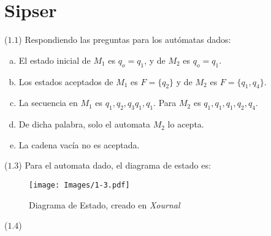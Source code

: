 

\section*{Sipser}



\begin{mdframed}[style = warning]
	\begin{problem}
		($1.1$) Respondiendo las preguntas para los autómatas dados:
			\begin{enumerate}[a)]
				\item El estado inicial de $M_1$ es $q_o = q_1$, y de $M_2$ es $q_o = q_1$.
				\item Los estados aceptados de $M_1$ es $F = \{ q_2 \}$ y de $M_2$ es $F = \{ q_1,q_4 \}$.
				\item La secuencia en $M_1$ es $q_1,q_2,q_3q_1,q_1$. Para $M_2$ es $q_1,q_1,q_1,q_2,q_4$.
				\item De dicha palabra, solo el automata $M_2$ lo acepta.
				\item La cadena vacía no es aceptada.
			\end{enumerate}
	\end{problem}
\end{mdframed}











\begin{mdframed}[style = warning]
	\begin{problem}
		($1.3$) Para el automata dado, el diagrama de estado es:
		\begin{figure}[H]
			\centering
			\texttt{[image: Images/1-3.pdf]}
			\caption{Diagrama de Estado, creado en \textit{Xournal}}
			\label{1-3}
		\end{figure}		 
	\end{problem}
\end{mdframed}












\begin{mdframed}[style = warning]
	\begin{problem}
		($1.4$) 	 
	\end{problem}
\end{mdframed}










